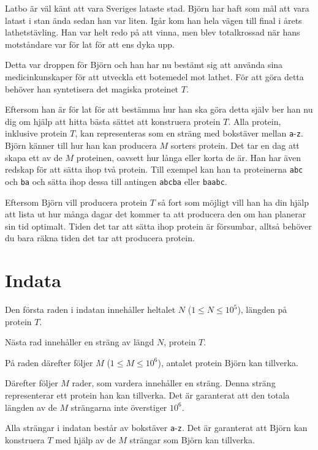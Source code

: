 
\noindent
Latbo är väl känt att vara Sveriges lataste stad. Björn har haft som mål att vara latast i stan
ända sedan han var liten. Igår kom han hela vägen till final i årets lathetstävling. Han var helt redo
på att vinna, men blev totalkrossad när hans motståndare var för lat för att ens dyka upp.

Detta var droppen för Björn och han har nu bestämt sig att använda sina medicinkunskaper för att
utveckla ett botemedel mot lathet. För att göra detta behöver han syntetisera det magiska proteinet $T$.

Eftersom han är för lat för att bestämma hur han ska göra detta själv ber han nu dig om hjälp att 
hitta bästa sättet att konstruera protein $T$. Alla protein, inklusive protein $T$, kan representeras
som en sträng med bokstäver mellan \texttt{a}-\texttt{z}. 
Björn känner till hur han kan producera $M$ sorters protein. Det tar en dag att skapa ett av de $M$ proteinen,
oavsett hur långa eller korta de är. Han har även redskap för att sätta ihop två protein. Till exempel
kan han ta proteinerna \texttt{abc} och \texttt{ba} och sätta ihop dessa till antingen \texttt{abcba} eller
\texttt{baabc}.

Eftersom Björn vill producera protein $T$ så fort som möjligt vill han ha din hjälp att lista ut hur många
dagar det kommer ta att producera den om han planerar sin tid optimalt. Tiden det tar att sätta ihop
protein är försumbar, alltså behöver du bara räkna tiden det tar att producera protein.


\section*{Indata}
Den första raden i indatan innehåller heltalet $N$ ($1 \le N \le 10^5$), längden på protein $T$.

Nästa rad innehåller en sträng av längd $N$, protein $T$.

På raden därefter följer $M$ ($1 \le M \le 10^6$), antalet protein Björn kan tillverka.

Därefter följer $M$ rader, som vardera innehåller en sträng. Denna sträng representerar ett protein han
kan tillverka. Det är garanterat att den totala längden av de $M$ strängarna inte överstiger $10^6$.

Alla strängar i indatan består av bokstäver \texttt{a}-\texttt{z}. Det är garanterat att Björn kan
konstruera $T$ med hjälp av de $M$ strängar som Björn kan tillverka.

